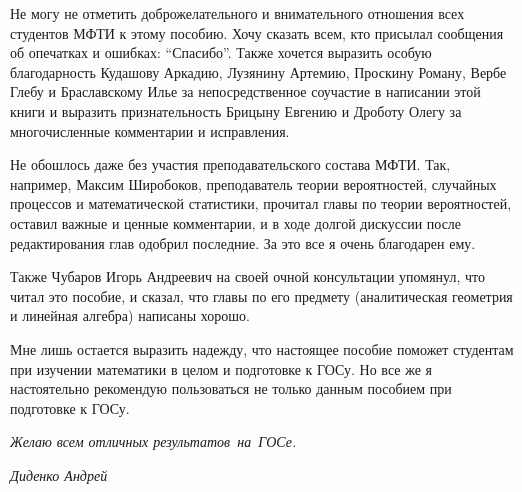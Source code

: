 Не могу не отметить доброжелательного и внимательного отношения всех студентов МФТИ к этому пособию. Хочу сказать всем, кто присылал сообщения об опечатках и ошибках: ``Спасибо''. Также хочется выразить особую благодарность Кудашову Аркадию, Лузянину Артемию, Проскину Роману, Вербе Глебу и Браславскому Илье за непосредственное соучастие в написании этой книги и выразить признательность Брицыну Евгению и Дроботу Олегу за многочисленные комментарии и исправления.

Не обошлось даже без участия преподавательского состава МФТИ. Так, например, Максим Широбоков, преподаватель теории вероятностей, случайных процессов и математической статистики, прочитал главы по теории вероятностей, оставил важные и ценные комментарии, и в ходе долгой дискуссии после редактирования глав одобрил последние. За это все я очень благодарен ему.

Также Чубаров Игорь Андреевич на своей очной консультации упомянул, что читал это пособие, и сказал, что главы по его предмету (аналитическая геометрия и линейная алгебра) написаны хорошо.
 
Мне лишь остается выразить надежду, что настоящее пособие поможет студентам при изучении математики в целом и подготовке к ГОСу. Но все же я настоятельно рекомендую пользоваться не только данным пособием при подготовке к ГОСу.

\vspace*{0.7\baselineskip} 

\textit{Желаю всем отличных результатов~на~ГОСе.}

\mbox{}

\noindent\textit{Диденко Андрей}
